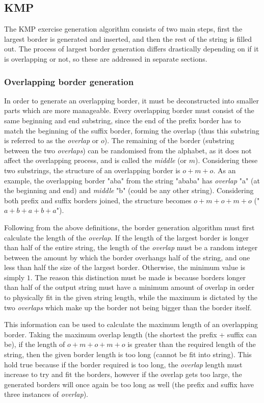 \documentclass{l4proj}
\begin{document}
\subsection{KMP}

The KMP exercise generation algorithm consists of two main steps, first the largest border is generated and inserted, and then the rest of the string is filled out. The process of largest border generation differs drastically depending on if it is overlapping or not, so these are addressed in separate sections.

\subsubsection{Overlapping border generation}
\label{sec:ob}

In order to generate an overlapping border, it must be deconstructed into smaller parts which are more manageable. Every overlapping border must consist of the same beginning and end substring, since the end of the prefix border has to match the beginning of the suffix border, forming the overlap (thus this substring is referred to as the \emph{overlap} or $o$). The remaining of the border (substring between the two \emph{overlaps}) can be randomised from the alphabet, as it does not affect the overlapping process, and is called the \emph{middle} (or $m$). Considering these two substrings, the structure of an overlapping border is $o+m+o$. As an example, the overlapping border "aba" from the string "ababa" has \emph{overlap} "a" (at the beginning and end) and \emph{middle} "b" (could be any other string). Considering both prefix and suffix borders joined, the structure becomes $o+m+o+m+o$ ("$a+b+a+b+a$").

Following from the above definitions, the border generation algorithm must first calculate the length of the \emph{overlap}. If the length of the largest border is longer than half of the entire string, the length of the \emph{overlap} must be a random integer between the amount by which the border overhangs half of the string, and one less than half the size of the largest border. Otherwise, the minimum value is simply $1$. The reason this distinction must be made is because borders longer than half of the output string must have a minimum amount of overlap in order to physically fit in the given string length, while the maximum is dictated by the two \emph{overlaps} which make up the border not being bigger than the border itself.

This information can be used to calculate the maximum length of an overlapping border. Taking the maximum overlap length (the shortest the prefix + suffix can be), if the length of $o+m+o+m+o$ is greater than the required length of the string, then the given border length is too long (cannot be fit into string). This hold true because if the border required is too long, the \emph{overlap} length must increase to try and fit the borders, however if the overlap gets too large, the generated borders will once again be too long as well (the prefix and suffix have three instances of \emph{overlap}).
\end{document}
